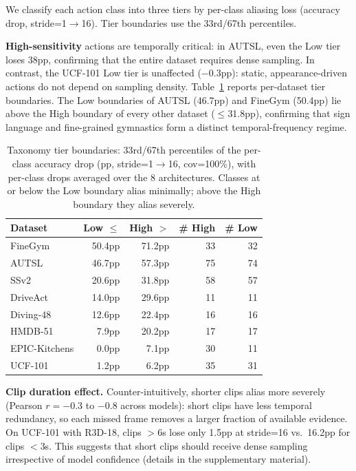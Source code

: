 \documentclass[a4paper, 10pt, conference]{ieeeconf}
\newcommand{\tabtight}{\setlength{\tabcolsep}{3.5pt}\renewcommand{\arraystretch}{1.10}}
\begin{document}
We classify each action class into three tiers by per-class aliasing loss (accuracy drop, stride=1$\to$16). Tier boundaries use the 33rd/67th percentiles.

\textbf{High-sensitivity} actions are temporally critical: in AUTSL, even the Low tier loses 38pp, confirming that the entire dataset requires dense sampling. In contrast, the UCF-101 Low tier is unaffected ($-0.3$pp): static, appearance-driven actions do not depend on sampling density. Table~\ref{tab:taxonomy_thresholds} reports per-dataset tier boundaries. The Low boundaries of AUTSL (46.7pp) and FineGym (50.4pp) lie above the High boundary of every other dataset ($\leq$31.8pp), confirming that sign language and fine-grained gymnastics form a distinct temporal-frequency regime.

\begin{table}[t]
\centering
\caption{Taxonomy tier boundaries: 33rd/67th percentiles of the per-class accuracy drop (pp, stride=1$\to$16, cov=100\%), with per-class drops averaged over the 8 architectures. Classes at or below the Low boundary alias minimally; above the High boundary they alias severely.}
\label{tab:taxonomy_thresholds}
\scriptsize\tabtight
\begin{tabular}{l r r r r}
\toprule
Dataset & Low $\leq$ & High $>$ & \# High & \# Low \\
\midrule
FineGym       & 50.4pp & 71.2pp & 33 & 32 \\
AUTSL         & 46.7pp & 57.3pp & 75 & 74 \\
SSv2          & 20.6pp & 31.8pp & 58 & 57 \\
DriveAct      & 14.0pp & 29.6pp & 11 & 11 \\
Diving-48     & 12.6pp & 22.4pp & 16 & 16 \\
HMDB-51       &  7.9pp & 20.2pp & 17 & 17 \\
EPIC-Kitchens &  0.0pp &  7.1pp & 30 & 11 \\
UCF-101       &  1.2pp &  6.2pp & 35 & 31 \\
\bottomrule
\end{tabular}
\end{table}

\textbf{Clip duration effect.} Counter-intuitively, shorter clips alias more severely (Pearson $r=-0.3$ to $-0.8$ across models): short clips have less temporal redundancy, so each missed frame removes a larger fraction of available evidence. On UCF-101 with R3D-18, clips $>$6s lose only 1.5pp at stride=16 vs.\ 16.2pp for clips $<$3s. This suggests that short clips should receive dense sampling irrespective of model confidence (details in the supplementary material).
\end{document}
